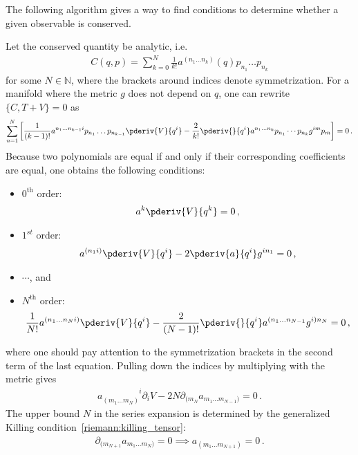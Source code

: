     The following algorithm gives a way to find conditions to determine whether a given observable is conserved.
    \begin{method}
        Let the conserved quantity be analytic, i.e.
        \begin{gather}
            C(q,p) = \sum_{k=0}^N\frac{1}{k!}a^{(n_1\ldots n_k)}(q)p_{n_1}\ldots p_{n_k}
        \end{gather}
        for some $N\in\mathbb{N}$, where the brackets around indices denote symmetrization. For a manifold where the metric $g$ does not depend on $q$, one can rewrite $\{C,T+V\} = 0$ as
        \begin{gather}
            \sum_{n=1}^N\left[\frac{1}{(k-1)!}a^{n_1\ldots n_{k-1}i}p_{n_1}\ldots p_{n_{k-1}}\pderiv{V}{q^i} - \frac{2}{k!}\pderiv{}{q^i}a^{n_1\ldots n_k}p_{n_1}\cdots p_{n_k}g^{im}p_m\right] = 0\,.
        \end{gather}
        Because two polynomials are equal if and only if their corresponding coefficients are equal, one obtains the following conditions:
        \begin{itemize}
            \item $0^{\text{th}}$ order:
                \begin{gather}
                    a^k\pderiv{V}{q^k} = 0\,,
                \end{gather}
            \item $1^{st}$ order:
                \begin{gather}
                    a^{(n_1i)}\pderiv{V}{q^i} - 2\pderiv{a}{q^i}g^{in_1} = 0\,,
                \end{gather}
            \item $\cdots$, and
            \item $N^{\text{th}}$ order:
                \begin{gather}
                    \frac{1}{N!}a^{(n_1\ldots n_Ni)}\pderiv{V}{q^i} - \frac{2}{(N-1)!}\pderiv{}{q^i}a^{(n_1\ldots n_{N-1}}g^{i)n_N} = 0\,,
                \end{gather}
        \end{itemize}
        where one should pay attention to the symmetrization brackets in the second term of the last equation. Pulling down the indices by multiplying with the metric gives
        \begin{gather}
            a_{(m_1\ldots m_N)}^{\phantom{(m_1\ldots m_N)}i}\partial_iV - 2N\partial_{(m_N}a_{m_1\ldots m_{N-1})} = 0\,.
        \end{gather}
        The upper bound $N$ in the series expansion is determined by the generalized Killing condition~\eqref{riemann:killing_tensor}:
        \begin{gather}
            \partial_{(m_{N+1}}a_{m_1\ldots m_N)} = 0\implies a_{(m_1\ldots m_{N+1})} = 0\,.
        \end{gather}
    \end{method}
